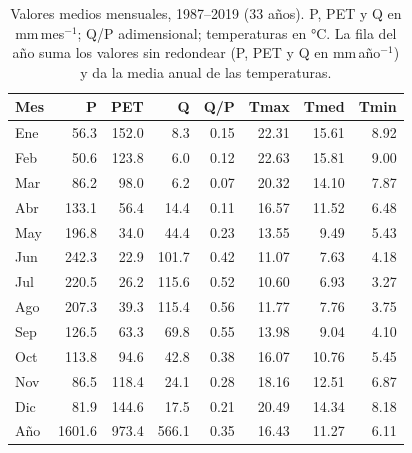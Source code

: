 \begin{table}[ht]
\centering
\caption{Valores medios mensuales, 1987--2019 (33 años). P, PET y Q en
mm\,mes$^{-1}$; Q/P adimensional; temperaturas en °C. La fila del año suma
los valores sin redondear (P, PET y Q en mm\,año$^{-1}$) y da la media anual
de las temperaturas.}
\label{tab:E03mensual}
\begin{tabular}{|l|r|r|r|r|r|r|r|}
\hline
Mes & P & PET & Q & Q/P & Tmax & Tmed & Tmin \\
\hline
Ene & 56.3 & 152.0 & 8.3 & 0.15 & 22.31 & 15.61 & 8.92 \\
\hline
Feb & 50.6 & 123.8 & 6.0 & 0.12 & 22.63 & 15.81 & 9.00 \\
\hline
Mar & 86.2 & 98.0 & 6.2 & 0.07 & 20.32 & 14.10 & 7.87 \\
\hline
Abr & 133.1 & 56.4 & 14.4 & 0.11 & 16.57 & 11.52 & 6.48 \\
\hline
May & 196.8 & 34.0 & 44.4 & 0.23 & 13.55 & 9.49 & 5.43 \\
\hline
Jun & 242.3 & 22.9 & 101.7 & 0.42 & 11.07 & 7.63 & 4.18 \\
\hline
Jul & 220.5 & 26.2 & 115.6 & 0.52 & 10.60 & 6.93 & 3.27 \\
\hline
Ago & 207.3 & 39.3 & 115.4 & 0.56 & 11.77 & 7.76 & 3.75 \\
\hline
Sep & 126.5 & 63.3 & 69.8 & 0.55 & 13.98 & 9.04 & 4.10 \\
\hline
Oct & 113.8 & 94.6 & 42.8 & 0.38 & 16.07 & 10.76 & 5.45 \\
\hline
Nov & 86.5 & 118.4 & 24.1 & 0.28 & 18.16 & 12.51 & 6.87 \\
\hline
Dic & 81.9 & 144.6 & 17.5 & 0.21 & 20.49 & 14.34 & 8.18 \\
\hline
Año & 1601.6 & 973.4 & 566.1 & 0.35 & 16.43 & 11.27 & 6.11 \\
\hline
\end{tabular}
\end{table}

